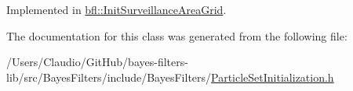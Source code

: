 Implemented in \mbox{\hyperlink{classbfl_1_1InitSurveillanceAreaGrid_a77598c277d7a25b4ee31791cc71da7b7}{bfl\+::\+Init\+Surveillance\+Area\+Grid}}.



The documentation for this class was generated from the following file\+:\begin{DoxyCompactItemize}
\item 
/\+Users/\+Claudio/\+Git\+Hub/bayes-\/filters-\/lib/src/\+Bayes\+Filters/include/\+Bayes\+Filters/\mbox{\hyperlink{ParticleSetInitialization_8h}{Particle\+Set\+Initialization.\+h}}\end{DoxyCompactItemize}
